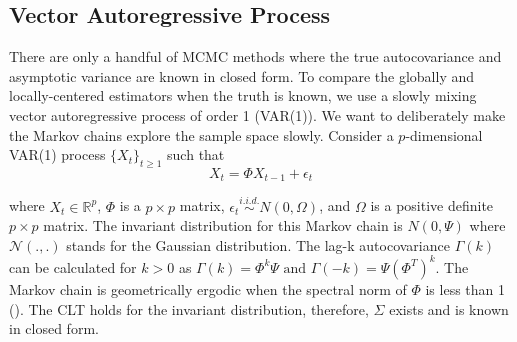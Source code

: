 \documentclass[11pt]{article}
\theoremstyle{remark}
\begin{document}


\subsection{Vector Autoregressive Process} \label{ex:var}

There are only a handful of MCMC methods where the true autocovariance and asymptotic variance are known in closed form. To compare the globally and locally-centered estimators when the truth is known, we use a slowly mixing vector autoregressive process of order 1 (VAR(1)). We want to deliberately make the Markov chains explore the sample space slowly. Consider a $p$-dimensional VAR(1) process $\{X_t\}_{t \geq 1}$ such that
%
\[
X_t = \Phi X_{t-1} + \epsilon_t
\]

where $X_t \in \mathbb{R}^p$, $\Phi $ is a $p \times p $ matrix, $ \epsilon_t \overset{i.i.d.}{\sim} N(0, \Omega)$, and $\Omega$ is a positive definite $p \times p$ matrix. The invariant distribution for this Markov chain is $N(0, \Psi)$ where $\mathcal{N}(.,.)$ stands for the Gaussian distribution. The lag-k autocovariance $\Gamma(k)$ can be calculated for $k >0$ as $\Gamma(k) = \Phi^k\Psi \textrm{ and } \Gamma(-k) = \Psi(\Phi^T)^k$. The Markov chain is geometrically ergodic when the spectral norm of $\Phi$ is less than 1 (\cite{10.2307/1427459}). The CLT holds for the invariant distribution, therefore, $\Sigma$ exists and is known in closed form.\\
\end{document}
